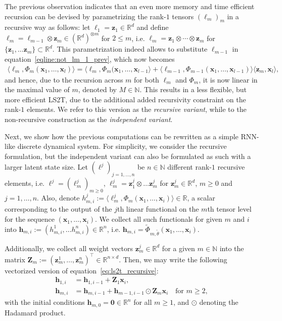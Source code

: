 \documentclass{article} \usepackage{iclr2021_conference,times}
\def\eqref#1{equation~\ref{#1}}
\newcommand{\R}{\mathbb{R}}
\newcommand{\bx}{\mathbf{x}}
\newcommand{\bz}{\mathbf{z}}
\newcommand{\bh}{\mathbf{h}}
\newcommand{\bZ}{\mathbf{Z}}
\newcommand{\NN}{\mathbb{N}}
\theoremstyle{plain}
\theoremstyle{definition}
\begin{document}
The previous observation indicates that an even more memory and time efficient recursion can be devised by parametrizing the rank-$1$ tensors $(\ell_m)_{m}$ in a recursive way as follows: let $\ell_1 = \bz_1 \in \R^d$ and define $\ell_{m} = \ell_{m-1} \otimes \bz_m \in (\R^d)^{\otimes m}$ for $2 \leq m$, i.e. $\ell_m = \bz_1 \otimes \cdots \otimes \bz_m$ for $\{\bz_1, \dots \bz_m \} \subset \R^d$. This parametrization indeed allows to substitute $\ell_{m-1}$ in \eqref{eqline:not_lm_1_prev}, which now becomes
\begin{align} \label{eq:ls2t_recursive}
    \langle \ell_m, \Phi_m(\bx_1, \dots, \bx_l) \rangle = \langle \ell_m, \Phi_m(\bx_1, \dots, \bx_{l-1} \rangle + \langle \ell_{m-1}, \Phi_{m-1}(\bx_1, \dots, \bx_{l-1})\rangle \langle \bz_m, \bx_{l} \rangle,
\end{align}
and hence, due to the recursion across $m$ for both $\ell_m$ and $\Phi_m$, it is now linear in the maximal value of $m$, denoted by $M \in \NN$. This results in a less flexible, but more efficient LS2T, due to the additional added recursivity constraint on the rank-$1$ elements. We refer to this version as the \textit{recursive variant}, while to the non-recursive construction as the \textit{independent variant}.

Next, we show how the previous computations can be rewritten as a simple RNN-like discrete dynamical system. For simplicity, we consider the recursive formulation, but the independent variant can also be formulated as such with a larger latent state size. Let $(\ell^j)_{j = 1, \dots, n}$ be $n \in \NN$ different rank-$1$ recursive elements, i.e. $\ell^j = (\ell^j_m)_{m \geq 0}$, $\ell^j_m = \bz^j_1 \otimes \dots \bz^j_m$ for $\bz^j_m \in \R^d$, $m \geq 0$ and $j = 1, \dots, n$. Also, denote $h_{m,i}^j := \langle \ell_m^j, \Phi_m(\bx_1, \dots, \bx_i) \rangle \in \R$, a scalar corresponding to the output of the $j$th linear functional on the $m$th tensor level for the sequence $(\bx_1, \dots, \bx_i)$. We collect all such functionals for given $m$ and $i$ into $\bh_{m, i} := (h_{m, i}^1, \dots h_{m, i}^n) \in \R^n$, i.e. $\bh_{m, i} = \tilde\Phi_{m, \tilde\theta}(\bx_1, \dots, \bx_i)$. 

Additionally, we collect all weight vectors $\bz_m^j \in \R^d$ for a given $m \in \NN$ into the matrix $\bZ_m := (\bz_m^1, \dots, \bz_m^n)^\top \in \R^{n \times d}$. Then, we may write the following vectorized version of \eqref{eq:ls2t_recursive}:
\begin{align}
    \bh_{1, i} &=     \bh_{1, i-1} + \bZ_1 \bx_i, \label{eq:ls2t_recursive_vectorized_lv1} \\
    \bh_{m, i} &= \bh_{m, i-1} + \bh_{m-1, i-1} \odot \bZ_m \bx_i \quad \text{for } m \geq 2,
\end{align}
with the initial conditions $\bh_{m, 0} = \mathbf{0} \in \R^n$ for all $m \geq 1$, and $\odot$ denoting the Hadamard product.
\end{document}
